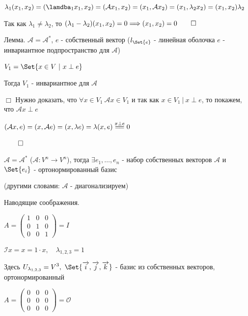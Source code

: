 \documentclass[12pt]{article}
\begin{document}
    $\displaystyle \lambda_1 (x_1, x_2) = (\lamdba_1 x_1, x_2) = (\mathcal{A} x_1, x_2) = (x_1, \mathcal{A} x_2) = (x_1, \lambda_2 x_2) = (x_1, x_2) \lambda_2$

    Так как $\displaystyle \lambda_1 \neq \lambda_2$, то $\displaystyle (\lambda_1 - \lambda_2) (x_1, x_2) = 0 \Longrightarrow (x_1, x_2) = 0 \qed$

    \Th Лемма. $\displaystyle \mathcal{A} = \mathcal{A}^*$, $e$ - собственный вектор ($\displaystyle l_{\Set{e}}$ - линейная оболочка $e$ - инвариантное подпространство для $\mathcal{A}$)

    $\displaystyle V_1 = \Set{x \in V \ | \ x \perp e}$

    Тогда $\displaystyle V_1$ - инвариантное для $\mathcal{A}$

    $\Box$ Нужно доказать, что $\displaystyle \forall x \in V_1 \ \mathcal{A}x \in V_1$ и так как $\displaystyle x \in V_1 \ | \ x \perp e$, то
    покажем, что $\mathcal{A}x \perp e$

    $(\mathcal{A}x, e) = (x, \mathcal{A}e) = (x, \lambda e) = \lambda (x, e) \stackrel{x \perp e}{=\joinrel=} 0$

    $\qed$

    \Th $\displaystyle \mathcal{A} = \mathcal{A}^*$ ($\displaystyle \mathcal{A} : V^n \to V^n$),
    тогда $\displaystyle \exists e_1, \dots, e_n$ - набор собственных векторов $\mathcal{A}$ и $\displaystyle \Set{e_i}$ - ортонормированный базис

    (другими словами: $\mathcal{A}$ - диагонализируем)

    Наводящие соображения.

     $A = \begin{pmatrix}1 & 0 & 0 \\ 0 & 1 & 0 \\ 0 & 0 & 1\end{pmatrix} = I$

    $\displaystyle \mathcal{I}x = x = 1 \cdot x, \quad \lambda_{1,2,3} = 1$

    Здесь $\displaystyle U_{\lambda_{1,2,3}} = V^3, \ \Set{\overrightarrow{i}, \overrightarrow{j}, \overrightarrow{k}}$ - базис из собственных векторов, ортонормированный

     $A = \begin{pmatrix}0 & 0 & 0 \\ 0 & 0 & 0 \\ 0 & 0 & 0\end{pmatrix} = \mathcal{O}$
\end{document}
